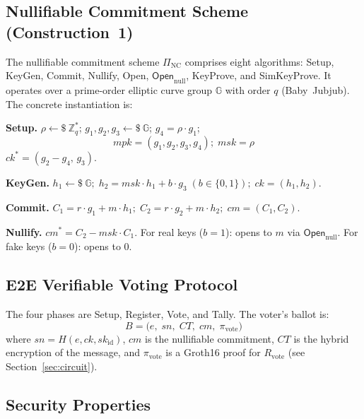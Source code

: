 \documentclass[conference]{IEEEtran}
\begin{document}
\subsection{Nullifiable Commitment Scheme (Construction~1)}

The nullifiable commitment scheme
$\Pi_{\mathrm{NC}}$ comprises eight algorithms:
\textsf{Setup}, \textsf{KeyGen}, \textsf{Commit}, \textsf{Nullify},
\textsf{Open}, $\textsf{Open}_{\mathrm{null}}$, \textsf{KeyProve},
and \textsf{SimKeyProve}.  It operates over a prime-order elliptic curve group
$\mathbb{G}$ with order $q$ (Baby~Jubjub).  The concrete instantiation is:

\vspace{4pt}
\noindent\textbf{Setup.}
$\rho \leftarrow\!\!\!\$\ \mathbb{Z}_q^*$;\;
$g_1,g_2,g_3 \leftarrow\!\!\!\$\ \mathbb{G}$;\;
$g_4 = \rho\cdot g_1$;
\[
  \mathit{mpk} = (g_1,g_2,g_3,g_4);\;
  \mathit{msk} = \rho
\]
$\mathit{ck}^* = (g_2 - g_4,\, g_3)$.

\vspace{4pt}
\noindent\textbf{KeyGen.}
$h_1 \leftarrow\!\!\!\$\ \mathbb{G};\;
h_2 = \mathit{msk}\cdot h_1 + b\cdot g_3\;(b\in\{0,1\});\;
\mathit{ck} = (h_1, h_2).$

\vspace{4pt}
\noindent\textbf{Commit.}
$C_1 = r\cdot g_1 + m\cdot h_1;\;
C_2 = r\cdot g_2 + m\cdot h_2;\;
\mathit{cm} = (C_1, C_2).$

\vspace{4pt}
\noindent\textbf{Nullify.}
$\mathit{cm}^* = C_2 - \mathit{msk}\cdot C_1.$
For real keys ($b=1$): opens to $m$ via $\mathsf{Open}_{\mathrm{null}}$.
For fake keys ($b=0$): opens to $0$.

\subsection{E2E Verifiable Voting Protocol}

The four phases are Setup, Register, Vote, and Tally.  The voter's ballot is:
\[
  B = \bigl(e,\; \mathit{sn},\; \mathit{CT},\; \mathit{cm},\; \pi_{\text{vote}}\bigr)
\]
where $\mathit{sn} = H(e, \mathit{ck}, \mathit{sk}_{\mathrm{id}})$,
$\mathit{cm}$ is the nullifiable commitment, $\mathit{CT}$ is the hybrid
encryption of the message, and $\pi_{\text{vote}}$ is a Groth16 proof for
$R_{\text{vote}}$ (see Section~\ref{sec:circuit}).

\subsection{Security Properties}
\end{document}
